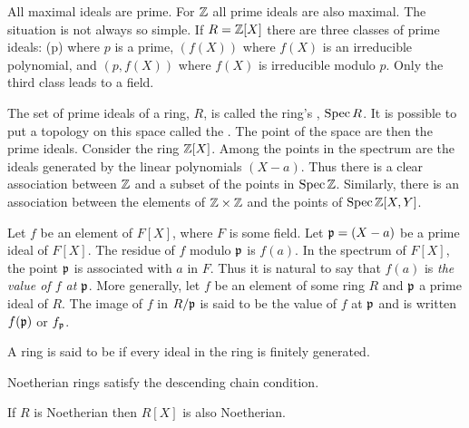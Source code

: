 All maximal ideals are prime.  For $\mathbb{Z}$ all prime ideals  are also maximal.
The situation is not always so simple.  If $R = \mathbb{Z}[X]$ there are three
classes of prime ideals: (p) where $p$ is a prime, $(f(X))$ where $f(X)$ is
an irreducible polynomial, and $(p, f(X))$ where $f(X)$ is irreducible
modulo $p$.  Only the third class leads to a field.

The set of prime ideals of a ring, $R$, is called the ring's
, $\mathop{\rm Spec}\nolimits R$.  It is possible to put a topology on this
space called the .  The point of the space are then the
prime ideals.  Consider the ring $\mathbb{Z}[X]$.  Among the points in the
spectrum are the ideals generated by the linear polynomials $(X - a)$.
Thus there is a clear association between $\mathbb{Z}$ and a subset of the
points in $\mathop{\rm Spec}\nolimits \mathbb{Z}$.  Similarly, there is an association between the
elements of $\mathbb{Z} \times \mathbb{Z}$ and the points of $\mathop{\rm Spec}\nolimits \mathbb{Z}[X, Y]$.

Let $f$ be an element of $F[X]$, where $F$ is some field.  Let 
${\mathfrak p} = (X - a)$ be a prime ideal of $F[X]$.  The residue of $f$ modulo
${\mathfrak p}$ is $f(a)$.  In the spectrum of $F[X]$, the point ${\mathfrak p}$ is
associated with $a$ in $F$.  Thus it is natural to say that $f(a)$ is 
{\em the value of $f$ at ${\mathfrak p}$}.  More generally,
let $f$ be an element of some ring $R$ and ${\mathfrak p}$ a prime ideal of $R$.
The image of $f$ in $R/{\mathfrak p}$ is said to be the value of $f$ at ${\mathfrak p}$ and
is written $f({\mathfrak p})$ or $f_{{\mathfrak p}}$.

\medskip

\begin{definition}
A ring is said to be  if every ideal in the ring is
finitely generated.
\end{definition}

\begin{proposition}
Noetherian rings satisfy the descending chain condition.
\end{proposition}

\begin{proposition} If $R$ is Noetherian then
$R[X]$ is also Noetherian.
\end{proposition}

